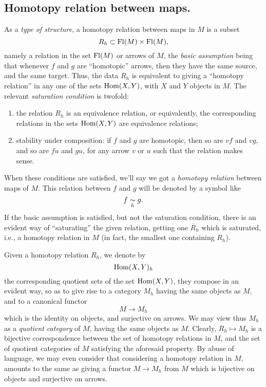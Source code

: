 \subsection[Homotopy relation between maps]{Homotopy relation between maps.}
\label{subsec:51.A}
As a \emph{type of structure}, a homotopy relation between
maps in $M$ is a subset
\[R_h\subset\operatorname{Fl}(M)\times\operatorname{Fl}(M),\]
namely a relation in the set $\operatorname{Fl}(M)$ or arrows of $M$, the
\emph{basic assumption} being that whenever $f$ and $g$ are
``homotopic'' arrows, then they have the same source, and the same
target. Thus, the data $R_h$ is equivalent to giving a ``homotopy
relation'' in any one of the sets $\operatorname{Hom}(X,Y)$, with $X$ and $Y$
objects in $M$. The relevant \emph{saturation condition} is twofold:
\begin{enumerate}[label=\alph*)]
\item\label{it:51.A.a}
  the relation $R_h$ is an equivalence relation, or equivalently, the
  corresponding relations in the sets $\operatorname{Hom}(X,Y)$ are equivalence
  relations;
\item\label{it:51.A.b}
  stability under composition: if $f$ and $g$ are homotopic, then so
  are $vf$ and $vg$, and so are $fu$ and $gu$, for any arrow $v$ or
  $u$ such that the relation makes sense.
\end{enumerate}

When these conditions are satisfied, we'll say we got a \emph{homotopy
  relation} between maps of $M$. This relation between $f$ and $g$
will be denoted by a symbol like
\[ f\mathrel{\underset{h}{\sim}} g.\]
If the basic assumption is satisfied, but not the saturation
condition, there is an evident way of ``saturating'' the given
relation, getting one $\overline R_h$ which is saturated, i.e., a homotopy
relation in $M$ (in fact, the smallest one containing $R_h$).

Given a homotopy relation $R_h$, we denote by
\[ \operatorname{Hom}(X,Y)_h\]
the corresponding quotient sets of the set $\operatorname{Hom}(X,Y)$, they compose
in an evident way, so as to give rise to a category $M_h$ having the
same objects as $M$, and to a canonical functor
\[ M\to M_h\]
which is the identity on objects, and surjective on arrows. We may
view thus $M_h$ as a \emph{quotient category} of $M$, having the same
objects as $M$. Clearly, $R_h\mapsto M_h$ is a bijective
correspondence between the set of homotopy relations in $M$, and the
set of quotient categories of $M$ satisfying the aforesaid
property. By abuse of language, we may even consider that considering
a homotopy relation in $M$, amounts to the same as giving a functor
$M\to M_h$ from $M$ which is bijective on objects and surjective on
arrows.

